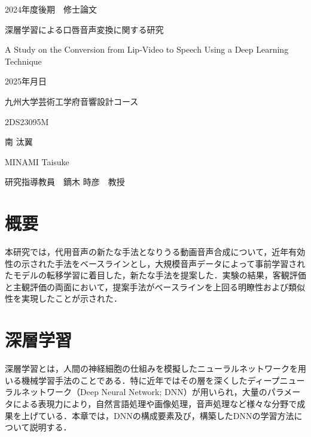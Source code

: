 \documentclass[12pt]{jarticle}
\numberwithin{equation}{section}    %
\numberwithin{figure}{section}      %
\numberwithin{table}{section}      %
\begin{document}
\begin{titlepage}
    \begin{center}
        {\Large 2024年度後期　修士論文}
        \vspace{120truept}

        {\huge 深層学習による口唇音声変換に関する研究}
        \vspace{30truept}

        {\huge A Study on the Conversion from Lip-Video to Speech Using a Deep Learning Technique}
        \vspace{120truept}

        {\Large 2025年月日}
        \vspace{10truept}

        {\Large 九州大学芸術工学府音響設計コース}
        \vspace{70truept}

        {\Large 2DS23095M}
        \vspace{10truept}

        {\Large 南 汰翼}
        \vspace{10truept}

        {\Large MINAMI Taisuke}
        \vspace{30truept}

        {\Large 研究指導教員　鏑木 時彦　教授}
    \end{center}
\end{titlepage}

\section*{概要}
\thispagestyle{empty}
本研究では，代用音声の新たな手法となりうる動画音声合成について，近年有効性の示された手法をベースラインとし，大規模音声データによって事前学習されたモデルの転移学習に着目した，新たな手法を提案した．実験の結果，客観評価と主観評価の両面において，提案手法がベースラインを上回る明瞭性および類似性を実現したことが示された．

\clearpage

\setcounter{tocdepth}{3}
\tableofcontents
\thispagestyle{empty}
\clearpage

\pagestyle{plain}
\setcounter{page}{1}


\clearpage


\clearpage

\section{深層学習}
深層学習とは，人間の神経細胞の仕組みを模擬したニューラルネットワークを用いる機械学習手法のことである．特に近年ではその層を深くしたディープニューラルネットワーク（Deep Neural Network; DNN）が用いられ，大量のパラメータによる表現力により，自然言語処理や画像処理，音声処理など様々な分野で成果を上げている．本章では，DNNの構成要素及び，構築したDNNの学習方法について説明する．


\end{document}
